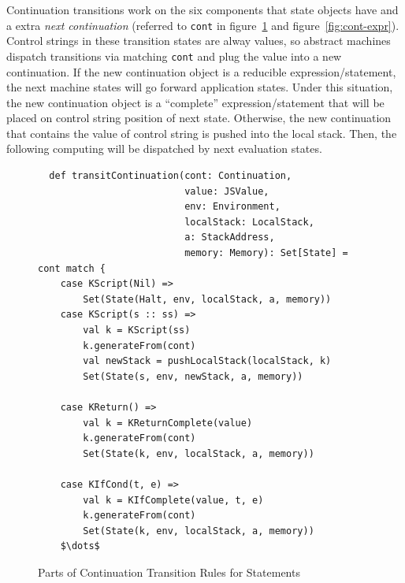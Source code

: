 \documentclass{article}
\begin{document}
Continuation transitions work on the six components that state objects have and a extra \emph{next continuation} (referred to \verb|cont| in figure~\ref{fig:cont-stmt} and figure~\ref{fig:cont-expr}). Control strings in these transition states are alway values, so abstract machines dispatch transitions via matching \verb|cont| and plug the value into a new continuation. If the new continuation object is a reducible expression/statement, the next machine states will go forward application states. Under this situation, the new continuation object is a ``complete'' expression/statement that will be placed on control string position of next state. Otherwise, the new continuation that contains the value of control string is pushed into the local stack. Then, the following computing will be dispatched by next evaluation states.


\begin{figure}
\lstset{language=Scala, mathescape}
\begin{lstlisting}
  def transitContinuation(cont: Continuation,
                          value: JSValue,
                          env: Environment,
                          localStack: LocalStack,
                          a: StackAddress,
                          memory: Memory): Set[State] = cont match {
    case KScript(Nil) =>
        Set(State(Halt, env, localStack, a, memory))
    case KScript(s :: ss) =>
        val k = KScript(ss)
        k.generateFrom(cont)
        val newStack = pushLocalStack(localStack, k)
        Set(State(s, env, newStack, a, memory))

    case KReturn() =>
        val k = KReturnComplete(value)
        k.generateFrom(cont)
        Set(State(k, env, localStack, a, memory))

    case KIfCond(t, e) =>
        val k = KIfComplete(value, t, e)
        k.generateFrom(cont)
        Set(State(k, env, localStack, a, memory))
    $\dots$
\end{lstlisting}
\caption{Parts of Continuation Transition Rules for Statements}
\label{fig:cont-stmt}
\end{figure}
\end{document}
